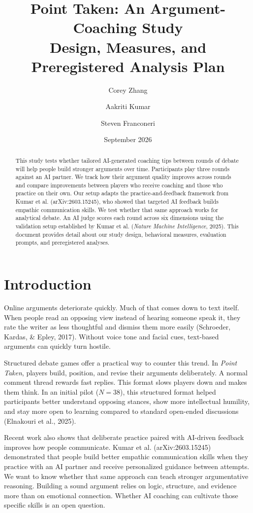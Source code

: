 \documentclass[11pt]{article}
\title{Point Taken: An Argument-Coaching Study\\
\large Design, Measures, and Preregistered Analysis Plan}
\author{Corey Zhang \and Aakriti Kumar \and Steven Franconeri}
\date{September 2026}
\begin{document}
\maketitle

\begin{abstract}
\noindent
This study tests whether tailored AI-generated coaching tips between rounds of debate will help people build stronger arguments over time. Participants play three rounds against an AI partner. We track how their argument quality improves across rounds and compare improvements between players who receive coaching and those who practice on their own. Our setup adapts the practice-and-feedback framework from Kumar et al. (arXiv:2603.15245), who showed that targeted AI feedback builds empathic communication skills. We test whether that same approach works for analytical debate. An AI judge scores each round across six dimensions using the validation setup established by Kumar et al. (\emph{Nature Machine Intelligence}, 2025). This document provides detail about our study design, behavioral measures, evaluation prompts, and preregistered analyses.
\end{abstract}

\section{Introduction}

Online arguments deteriorate quickly. Much of that comes down to text itself. When people read an opposing view instead of hearing someone speak it, they rate the writer as less thoughtful and dismiss them more easily (Schroeder, Kardas, \& Epley, 2017). Without voice tone and facial cues, text-based arguments can quickly turn hostile.

Structured debate games offer a practical way to counter this trend. In \emph{Point Taken}, players build, position, and revise their arguments deliberately. A normal comment thread rewards fast replies. This format slows players down and makes them think. In an initial pilot ($N = 38$), this structured format helped participants better understand opposing stances, show more intellectual humility, and stay more open to learning compared to standard open-ended discussions (Elnakouri et al., 2025).

Recent work also shows that deliberate practice paired with AI-driven feedback improves how people communicate. Kumar et al. (arXiv:2603.15245) demonstrated that people build better empathic communication skills when they practice with an AI partner and receive personalized guidance between attempts. We want to know whether that same approach can teach stronger argumentative reasoning. Building a sound argument relies on logic, structure, and evidence more than on emotional connection. Whether AI coaching can cultivate those specific skills is an open question.
\end{document}
